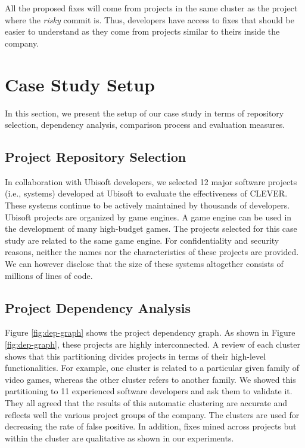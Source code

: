 \documentclass[sigconf]{acmart}
\begin{document}
All the proposed fixes will come from projects in the same cluster as
the project where the \emph{risky} commit is. Thus, developers have
access to fixes that should be easier to understand as they come from
projects similar to theirs inside the company.

\section{Case Study Setup}\label{sec:exp}

In this section, we present the setup of our case study in terms of
repository selection, dependency analysis, comparison process and
evaluation measures.

\subsection{Project Repository Selection}\label{sec:rep}

In collaboration with Ubisoft developers, we selected 12 major software
projects (i.e., systems) developed at Ubisoft to evaluate the
effectiveness of CLEVER. These systems continue to be actively
maintained by thousands of developers. Ubisoft projects are organized by
game engines. A game engine can be used in the development of many
high-budget games. The projects selected for this case study are related
to the same game engine. For confidentiality and security reasons,
neither the names nor the characteristics of these projects are
provided. We can however disclose that the size of these systems
altogether consists of millions of lines of code.

\subsection{Project Dependency Analysis}\label{sec:dependencies}

Figure \ref{fig:dep-graph} shows the project dependency graph. As shown
in Figure \ref{fig:dep-graph}, these projects are highly interconnected.
A review of each cluster shows that this partitioning divides projects
in terms of their high-level functionalities. For example, one cluster
is related to a particular given family of video games, whereas the
other cluster refers to another family. We showed this partitioning to
11 experienced software developers and ask them to validate it. They all
agreed that the results of this automatic clustering are accurate and
reflects well the various project groups of the company. The clusters
are used for decreasing the rate of false positive. In addition, fixes
mined across projects but within the cluster are qualitative as shown in
our experiments.
\end{document}
